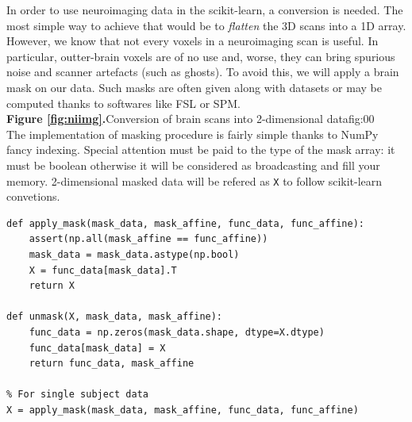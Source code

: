 \documentclass{frontiersSCNS} %
\newcommand{\alex}[1]{\todo[inline, color=green!40]{#1}}
\begin{document}
In order to use neuroimaging data in the scikit-learn, a
conversion is needed. The most simple way to achieve that would be to
\emph{flatten} the 3D scans into a 1D array. However, we know that not every
voxels in a neuroimaging scan is useful. In particular, outter-brain voxels are
of no use and, worse, they can bring spurious noise and scanner artefacts (such
as ghosts). To avoid this, we will apply a brain mask on our data. Such masks
are often given along with datasets or may be computed thanks to softwares like
FSL or SPM.\\

\textbf{Figure \ref{fig:niimg}.}{Conversion of brain scans into 2-dimensional
data}{fig:00}\\

The implementation of masking procedure is fairly simple thanks to NumPy fancy
indexing. Special attention must be paid to the type of the mask array: it must
be boolean otherwise it will be considered as broadcasting and fill your memory.
2-dimensional masked data will be refered as \texttt{X} to follow scikit-learn
convetions.

\begin{lstlisting}
def apply_mask(mask_data, mask_affine, func_data, func_affine):
    assert(np.all(mask_affine == func_affine))
    mask_data = mask_data.astype(np.bool)
    X = func_data[mask_data].T
    return X

def unmask(X, mask_data, mask_affine):
    func_data = np.zeros(mask_data.shape, dtype=X.dtype)
    func_data[mask_data] = X
    return func_data, mask_affine

% For single subject data
X = apply_mask(mask_data, mask_affine, func_data, func_affine)
\end{lstlisting}





\end{document}
